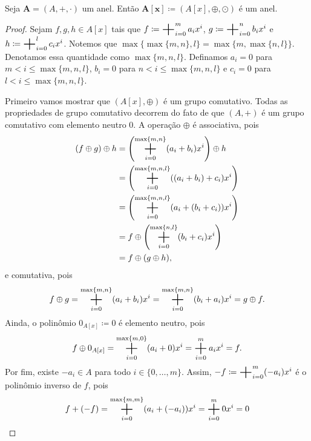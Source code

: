 \begin{prop}
	Seja $\bm A=(A,+,\cdot)$ um anel. Então $\bm{A[x]} \coloneqq (A[x],\oplus,\odot)$ é um anel.
\end{prop}
\begin{proof}
	Sejam $f,g,h \in A[x]$ tais que $f \coloneqq \bigsum_{i=0}^m a_ix^i$, $g \coloneqq \bigsum_{i=0}^n b_ix^i$ e $h \coloneqq \bigsum_{i=0}^l c_ix^i$. Notemos que $\max\{\max\{m,n\},l\}=\max\{m,\max\{n,l\}\}$. Denotamos essa quantidade como $\max\{m,n,l\}$. Definamos $a_i=0$ para $m < i \leq \max\{m,n,l\}$, $b_i=0$ para $n < i \leq \max\{m,n,l\}$ e $c_i=0$ para $l < i \leq \max\{m,n,l\}$.

	Primeiro vamos mostrar que $(A[x],\oplus)$ é um grupo comutativo. Todas as propriedades de grupo comutativo decorrem do fato de que $(A,+)$ é um grupo comutativo com elemento neutro $0$. A operação $\oplus$ é associativa, pois
	\begin{equation*}
	\begin{split}
	(f \oplus g) \oplus h &= \left( \bigsum_{i=0}^{\max\{m,n\}} (a_i+b_i)x^i \right) \oplus h \\
		&= \left( \bigsum_{i=0}^{\max\{m,n,l\}} ((a_i+b_i)+c_i)x^i \right) \\
		&= \left( \bigsum_{i=0}^{\max\{m,n,l\}} (a_i+(b_i+c_i))x^i \right) \\
		&= f \oplus \left( \bigsum_{i=0}^{\max\{n,l\}} (b_i+c_i)x^i \right) \\
		&= f \oplus (g \oplus h),
	 \end{split}
	 \end{equation*}
e comutativa, pois
	 \begin{equation*}
	f \oplus g = \bigsum_{i=0}^{\max\{m,n\}} (a_i+b_i)x^i = \bigsum_{i=0}^{\max\{m,n\}} (b_i+a_i)x^i = g \oplus f.
	 \end{equation*}
Ainda, o polinômio $0_{A[x]} \coloneqq 0$ é elemento neutro, pois
	\begin{equation*}
	f \oplus 0_{A[x]} = \bigsum_{i=0}^{\max\{m,0\}} (a_i+0)x^i = \bigsum_{i=0}^m a_ix^i = f.
	 \end{equation*}
Por fim, existe $-a_i \in A$ para todo $i \in \{0, \ldots, m\}$. Assim, $-f \coloneq \bigsum_{i=0}^m (-a_i)x^i$ é o polinômio inverso de $f$, pois
	\begin{equation*}
	f+(-f) = \bigsum_{i=0}^{\max\{m,m\}} (a_i+(-a_i))x^i = \bigsum_{i=0}^m 0x^i = 0
	\end{equation*}


\end{proof}
